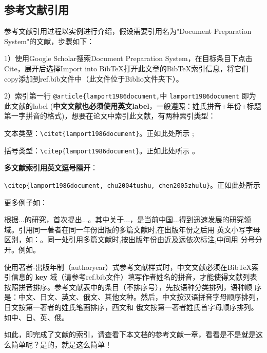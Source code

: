 \subsection{参考文献引用}
%

参考文献引用过程以实例进行介绍，假设需要引用名为"Document Preparation System"的文献，步骤如下：

1）使用Google Scholar搜索Document Preparation System，在目标条目下点击Cite，展开后选择Import into BibTeX打开此文章的BibTeX索引信息，将它们copy添加到ref.bib文件中（此文件位于Biblio文件夹下）。

2）索引第一行 \verb|@article{lamport1986document,|中 \verb|lamport1986document| 即为此文献的label (\textbf{中文文献也必须使用英文label}，一般遵照：姓氏拼音+年份+标题第一字拼音的格式)，想要在论文中索引此文献，有两种索引类型：

    文本类型：\verb|\citet{lamport1986document}|。正如此处所示 \citet{lamport1986document};

    括号类型：\verb|\citep{lamport1986document}|。正如此处所示 \citep{lamport1986document}。

    \textbf{多文献索引用英文逗号隔开}：

    \verb|\citep{lamport1986document, chu2004tushu, chen2005zhulu}|。正如此处所示 \citep{lamport1986document, chu2004tushu, chen2005zhulu}

    更多例子如：

    \citet{walls2013drought}根据...的研究，首次提出...。其中关于...\citep{walls2013drought}，是当前中国...得到迅速发展的研究领域\citep{chen1980zhongguo}。引用同一著者在同一年份出版的多篇文献时,在出版年份之后用
    英文小写字母区别，如：\citep{yuan2012lana, yuan2012lanb, yuan2012lanc}。同一处引用多篇文献时,按出版年份由近及远依次标注,中间用
    分号分开。例如\citep{chen1980zhongguo, stamerjohanns2009mathml, hls2012jinji, niu2013zonghe}。

    使用著者-出版年制（authoryear）式参考文献样式时，中文文献必须在BibTeX索引信息的 \textbf{key} 域（请参考ref.bib文件）填写作者姓名的拼音，才能使得文献列表按照拼音排序。参考文献表中的条目（不排序号），先按语种分类排列，语种顺 序是：中文、日文、英文、俄文、其他文种。然后，中文按汉语拼音字母顺序排列，日文按第一著者的姓氏笔画排序，西文和 俄文按第一著者姓氏首字母顺序排列。如中\citep{niu2013zonghe}、日\citep{Bohan1928}、英\citep{stamerjohanns2009mathml}、俄\citep{Dubrovin1906}。

    如此，即完成了文献的索引，请查看下本文档的参考文献一章，看看是不是就是这么简单呢？是的，就是这么简单！

